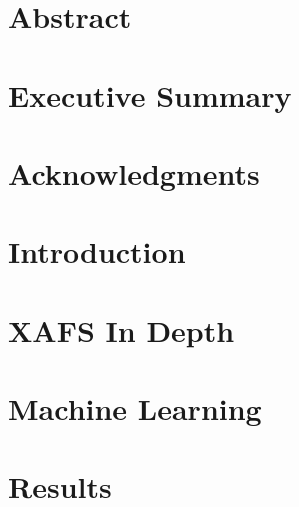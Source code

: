 \documentclass[12pt, oneside]{book}
\begin{document}
\chapter{Abstract}

\chapter{Executive Summary}


\chapter{Acknowledgments}


\tableofcontents

\listoffigures

\mainmatter

\chapter{Introduction}


\chapter{XAFS In Depth}


\chapter{Machine Learning}


\chapter{Results}

\end{document}
